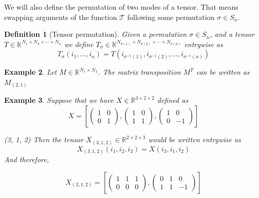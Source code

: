 \documentclass[11pt,a4paper,openright,oneside]{book}
\numberwithin{equation}{section}
\newtheorem{defn0}{Definition}[chapter]
\newtheorem{example0}[defn0]{Example}
\newenvironment{definition}{ \begin{defn0}}{\end{defn0}}
\newenvironment{example}{ \begin{example0}\rm}{\end{example0}}
\begin{document}
We will also define the permutation of two modes of a tensor. That means swapping arguments of the function $\mathcal{T}$
following some permutation $\sigma \in S_n$.

\begin{definition}[Tensor permutation]
    Given a permutation $\sigma \in S_n$, and a tensor $T \in \mathbb{K}^{N_1 \times N_2 \times \cdots \times N_n}$ we define
    $T_\sigma \in \mathbb{K}^{N_{\sigma(1)} \times N_{\sigma(2)} \times \cdots \times N_{\sigma(n)}}$ entrywise as
    $$T_\sigma (i_1, \dots, i_n) = T(i_{\sigma^{-1}(1)}, i_{\sigma^{-1}(2)}, \dots, i_{\sigma^{-1}(n)})$$
\end{definition}

\begin{example}
    Let $M \in \mathbb{K}^{N_1 \times N_2}$. The matrix transposition $M^T$ can be written as $M_{(2, 1)}$ 
\end{example}

\begin{example}
    Suppose that we have $X \in \mathbb{R}^{3 \times 2 \times 2}$ defined as
    $$X = \left[\begin{pmatrix}
            1 & 0 \\
            0 & 1
        \end{pmatrix}, 
        \begin{pmatrix}
            1 & 0 \\
            1 & 1
        \end{pmatrix},
        \begin{pmatrix}
            1 & 0 \\
            0 & -1
        \end{pmatrix}
        \right]$$

        (3, 1, 2)
        Then the tensor $X_{(3, 1, 2)} \in \mathbb{R}^{2 \times 2 \times 3}$ would be written entrywise as
        $$X_{(3, 1, 2)}(i_1, i_2, i_3) = X(i_3, i_1, i_2)$$
        And therefore,

        $$X_{(3,1,2)} = \left[\begin{pmatrix} 1 & 1 & 1 \\ 0 & 0 & 0  \end{pmatrix}, \begin{pmatrix}  0 & 1 & 0 \\ 1 & 1 & -1 \end{pmatrix} \right]$$ 


    \label{ex:perm}
\end{example}
\end{document}
